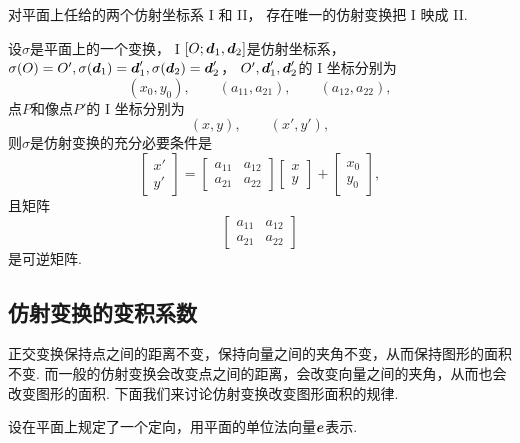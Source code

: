 \begin{corollary}
对平面上任给的两个仿射坐标系 I 和 II，
存在唯一的仿射变换把 I 映成 II.
\end{corollary}

\begin{theorem}
设\(\sigma\)是平面上的一个变换，
I \([O;\boldsymbol{d}_1,\boldsymbol{d}_2]\)是仿射坐标系，
\(
	\sigma(O) = O',
	\sigma(\boldsymbol{d}_1) = \boldsymbol{d}'_1,
	\sigma(\boldsymbol{d}_2) = \boldsymbol{d}'_2
\)，
\(O',\boldsymbol{d}'_1,\boldsymbol{d}'_2\)的 I 坐标分别为\begin{equation*}
	(x_0,y_0),
	\qquad
	(a_{11},a_{21}),
	\qquad
	(a_{12},a_{22}),
\end{equation*}
点\(P\)和像点\(P'\)的 I 坐标分别为\begin{equation*}
	(x,y),
	\qquad
	(x',y'),
\end{equation*}
则\(\sigma\)是仿射变换的充分必要条件是\begin{equation*}
	\begin{bmatrix}
		x' \\ y'
	\end{bmatrix}
	= \begin{bmatrix}
		a_{11} & a_{12} \\
		a_{21} & a_{22}
	\end{bmatrix}
	\begin{bmatrix}
		x \\ y
	\end{bmatrix}
	+ \begin{bmatrix}
		x_0 \\ y_0
	\end{bmatrix},
\end{equation*}
且矩阵\begin{equation*}
	\begin{bmatrix}
		a_{11} & a_{12} \\
		a_{21} & a_{22}
	\end{bmatrix}
\end{equation*}
是可逆矩阵.
\end{theorem}

\subsection{仿射变换的变积系数}
正交变换保持点之间的距离不变，保持向量之间的夹角不变，从而保持图形的面积不变.
而一般的仿射变换会改变点之间的距离，会改变向量之间的夹角，从而也会改变图形的面积.
下面我们来讨论仿射变换改变图形面积的规律.

设在平面上规定了一个定向，用平面的单位法向量\(\boldsymbol{e}\)表示.
